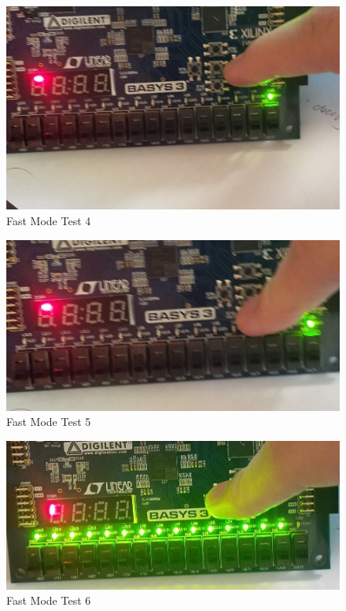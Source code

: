 \documentclass[11pt]{article}
\begin{document}
\begin{figure}[ht]\centering
\includegraphics[width=1.0\textwidth,trim=0 0mm 0 0,clip]{Fast4}
\caption{Fast Mode Test 4}
\end{figure}
\begin{figure}[ht]\centering
\includegraphics[width=1.0\textwidth,trim=0 0mm 0 0,clip]{Fast5}
\caption{Fast Mode Test 5}
\end{figure}
\begin{figure}[ht]\centering
\includegraphics[width=1.0\textwidth,trim=0 0mm 0 0,clip]{Fast6}
\caption{Fast Mode Test 6}
\end{figure}
\end{document}
